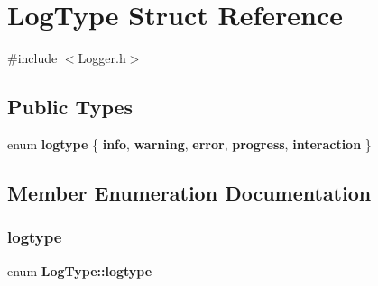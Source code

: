 \section{Log\+Type Struct Reference}
\label{struct_log_type}


{\ttfamily \#include $<$Logger.\+h$>$}

\subsection*{Public Types}
\begin{DoxyCompactItemize}
\item 
enum \textbf{ logtype} \{ \newline
\textbf{ info}, 
\textbf{ warning}, 
\textbf{ error}, 
\textbf{ progress}, 
\newline
\textbf{ interaction}
 \}
\end{DoxyCompactItemize}


\subsection{Member Enumeration Documentation}
\mbox{\label{struct_log_type_a42f5153a559d41c697e4763ed36ff217}} 
\subsubsection{logtype}
{\footnotesize\ttfamily enum \textbf{ Log\+Type\+::logtype}}

